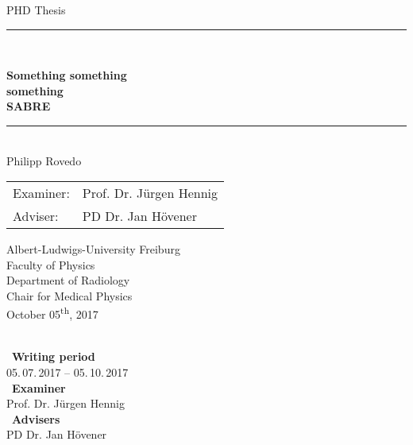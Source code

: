 
\begin{titlepage}
\begin{center}

\newcommand{\HorizontalLine}{\rule{\linewidth}{0.3mm}}

{\Large PHD Thesis}\\[1.3cm]


\HorizontalLine \\[0.4cm]
\begin{spacing}{3}
    {\huge \bfseries  Something something } \\
    {\huge \bfseries something} \\
    {\huge \bfseries SABRE}\\
\end{spacing}
\HorizontalLine \\[1.5cm]


	{\Huge Philipp Rovedo} \\[2cm]


\begin{tabular}[hc]{>{\huge}l >{\huge}l}
  Examiner: & Prof. Dr. J\"urgen Hennig \\[0.3cm]
  Adviser: & PD Dr. Jan H\"ovener \\[1.2cm]
\end{tabular}
\vfill  %

\Large {
    Albert-Ludwigs-University Freiburg\\
    Faculty of Physics\\
    Department of Radiology\\
    Chair for Medical Physics\\[1cm]

    October 05\textsuperscript{th}, 2017\\
}
\end{center}
\end{titlepage}

\ \vfill \ \\  %
\
\textbf{Writing period}            \smallskip{} \\
05.\,07.\,2017 -- 05.\,10.\,2017   \bigskip{} \\
\
\textbf{Examiner}                  \smallskip{} \\
Prof. Dr. J\"urgen Hennig               \bigskip{} \\
\
\textbf{Advisers}                  \smallskip{} \\
PD Dr. Jan H\"ovener
